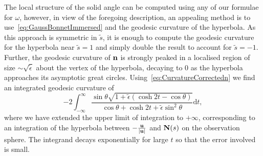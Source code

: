     The local structure of the solid angle can be computed using any of our formulae for $\omega$, however, in view of the foregoing description, an appealing method is to use~\eqref{eq:GaussBonnetImmersed} and the geodesic curvature of the hyperbola. As this approach is symmetric in $\tilde{s}$, it is enough to compute the geodesic curvature for the hyperbola near $\tilde{s}=1$ and simply double the result to account for $\tilde{s}=-1$. Further, the geodesic curvature of $\bf n$ is strongly peaked in a localised region of size $\sim\sqrt{\tilde{\epsilon}}$ about the vertex of the hyperbola, decaying to $0$ as the hyperbola approaches its asymptotic great circles. 
    Using~\eqref{eq:CurvatureCorrectedn} we find an integrated geodesic curvature of 
    \begin{equation}
        -2 \int_{-\infty}^{\infty}\frac{\sin \theta\sqrt{1+\tilde{\epsilon}( \cosh 2t - \cos \theta)} }{\cos \theta + \cosh 2t + \tilde{\epsilon} \sin^2 \theta } \mathrm{d}t,
        \label{eq:CurvatureCorrectionIntegration}
    \end{equation} 
    where we have extended the upper limit of integration to $+\infty$, corresponding to an integration of the hyperbola between $- \frac{{\bf u}}{|{\bf u}|}$ and ${\bf N}(s)$ on the observation sphere. The integrand decays exponentially for large $t$ so that the error involved is small. 

